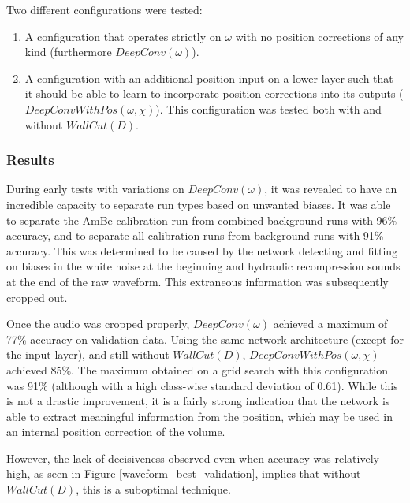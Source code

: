 \documentclass[10pt]{article}
\begin{document}
Two different configurations were tested:
\begin{enumerate}
    \item A configuration that operates strictly on $\omega$ with no position corrections of any kind (furthermore $DeepConv(\omega)$).
    \item A configuration with an additional position input on a lower layer such that it should be able to learn to incorporate position corrections into its outputs ($DeepConvWithPos(\omega, \chi)$). This configuration was tested both with and without $WallCut(D)$.
\end{enumerate}

\subsubsection{Results}

During early tests with variations on $DeepConv(\omega)$, it was revealed to have an incredible capacity to separate run types based on unwanted biases. It was able to separate the AmBe calibration run from combined background runs with 96\% accuracy, and to separate all calibration runs from background runs with 91\% accuracy. This was determined to be caused by the network detecting and fitting on biases in the white noise at the beginning and hydraulic recompression sounds at the end of the raw waveform. This extraneous information was subsequently cropped out.

Once the audio was cropped properly, $DeepConv(\omega)$ achieved a maximum of 77\% accuracy on validation data. Using the same network architecture (except for the input layer), and still without $WallCut(D)$, $DeepConvWithPos(\omega, \chi)$ achieved 85\%. The maximum obtained on a grid search with this configuration was 91\% (although with a high class-wise standard deviation of 0.61). While this is not a drastic improvement, it is a fairly strong indication that the network is able to extract meaningful information from the position, which may be used in an internal position correction of the volume.

However, the lack of decisiveness observed even when accuracy was relatively high, as seen in Figure \ref{waveform_best_validation}, implies that without $WallCut(D)$, this is a suboptimal technique.
\end{document}

